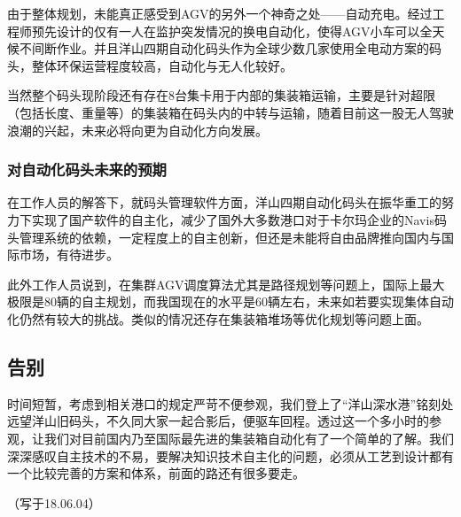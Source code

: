 由于整体规划，未能真正感受到AGV的另外一个神奇之处——自动充电。经过工程师预先设计的仅有一人在监护突发情况的换电自动化，使得AGV小车可以全天候不间断作业。并且洋山四期自动化码头作为全球少数几家使用全电动方案的码头，整体环保运营程度较高，自动化与无人化较好。

当然整个码头现阶段还有存在8台集卡用于内部的集装箱运输，主要是针对超限（包括长度、重量等）的集装箱在码头内的中转与运输，随着目前这一股无人驾驶浪潮的兴起，未来必将向更为自动化方向发展。

\subsubsection{对自动化码头未来的预期}

在工作人员的解答下，就码头管理软件方面，洋山四期自动化码头在振华重工的努力下实现了国产软件的自主化，减少了国外大多数港口对于卡尔玛企业的Navis码头管理系统的依赖，一定程度上的自主创新，但还是未能将自由品牌推向国内与国际市场，有待进步。

此外工作人员说到，在集群AGV调度算法尤其是路径规划等问题上，国际上最大极限是80辆的自主规划，而我国现在的水平是60辆左右，未来如若要实现集体自动化仍然有较大的挑战。类似的情况还存在集装箱堆场等优化规划等问题上面。

\subsection{告别}

时间短暂，考虑到相关港口的规定严苛不便参观，我们登上了“洋山深水港”铭刻处远望洋山旧码头，不久同大家一起合影后，便驱车回程。透过这一个多小时的参观，让我们对目前国内乃至国际最先进的集装箱自动化有了一个简单的了解。我们深深感叹自主技术的不易，要解决知识技术自主化的问题，必须从工艺到设计都有一个比较完善的方案和体系，前面的路还有很多要走。

\noindent （写于18.06.04）